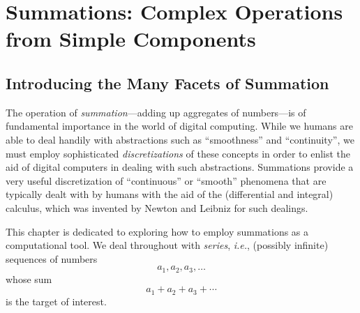 
\chapter{Summations:
Complex Operations from Simple Components}
\label{ch:Summation}


\section{Introducing the Many Facets of Summation}
\label{sec:intro}

The operation of {\it summation}---adding up aggregates of
numbers---is of fundamental importance in the world of digital
computing.  While we humans are able to deal handily with abstractions
such as ``smoothness'' and ``continuity'', we must employ
sophisticated {\em discretizations} of these concepts in order to
enlist the aid of digital computers in dealing with such abstractions.
Summations provide a very useful discretization of ``continuous'' or
``smooth'' phenomena that are typically dealt with by humans with the
aid of the (differential and integral) calculus, which was invented by
Newton and Leibniz for such dealings.

This chapter is dedicated to exploring how to employ summations as a
computational tool.  We deal throughout with {\it series}, {\it i.e.},
(possibly infinite) sequences of numbers
\[ a_1, a_2, a_3, \ldots \]
whose sum
\begin{equation}
\label{eq:abstract-sum}
a_1 + a_2 + a_3 + \cdots
\end{equation}
is the target of interest.

\medskip

\noindent {}

